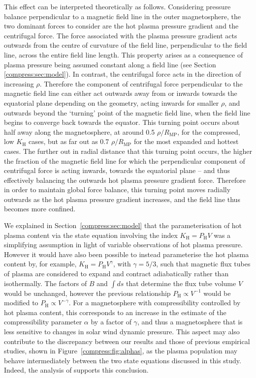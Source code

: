 This effect can be interpreted theoretically as follows. Considering pressure balance perpendicular to a magnetic field line in the outer magnetosphere, the two dominant forces to consider are the hot plasma pressure gradient and the centrifugal force. The force associated with the plasma pressure gradient acts outwards from the centre of curvature of the field line, perpendicular to the field line, across the entire field line length. This property arises as a consequence of plasma pressure being assumed constant along a field line (see Section \ref{compress:sec:model}). In contrast, the centrifugal force acts in the direction of increasing $\rho$. Therefore the component of centrifugal force perpendicular to the magnetic field line can either act outwards away from or inwards towards the equatorial plane depending on the geometry, acting inwards for smaller $\rho$, and outwards beyond the `turning' point of the magnetic field line, when the field line begins to converge back towards the equator. This turning point occurs about half away along the magnetosphere, at around 0.5 $\rho/R_\mathrm{MP}$, for the compressed, low $K_\mathrm{H}$ cases, but as far out as 0.7 $\rho/R_\mathrm{MP}$ for the most expanded and hottest cases. The further out in radial distance that this turning point occurs, the higher the fraction of the magnetic field line for which the perpendicular component of centrifugal force is acting inwards, towards the equatorial plane – and thus effectively balancing the outwards hot plasma pressure gradient force. Therefore in order to maintain global force balance, this turning point moves radially outwards as the hot plasma pressure gradient increases, and the field line thus becomes more confined.

We explained in Section~\ref{compress:sec:model} that the parameterisation of hot plasma content via the state equation involving the index $K_\mathrm{H}=P_\mathrm{H}V$ was a simplifying assumption in light of variable observations of hot plasma pressure. However it would have also been possible to instead parameterise the hot plasma content by, for example, $K_\mathrm{H}=P_\mathrm{H}V^\gamma$, with $\gamma=5/3$, such that magnetic flux tubes of plasma are considered to expand and contract adiabatically rather than isothermally. The factors of $B$ and $\int ds$ that determine the flux tube volume $V$ would be unchanged, however the previous relationship $P_\mathrm{H}\propto V^{-1}$ would be modified to $P_\mathrm{H} \propto V^{-\gamma}$. For a magnetosphere with compressibility controlled by hot plasma content, this corresponds to an increase in the estimate of the compressibility parameter $\alpha$ by a factor of $\gamma$, and thus a magnetosphere that is less sensitive to changes in solar wind dynamic pressure. This aspect may also contribute to the discrepancy between our results and those of previous empirical studies, shown in Figure~\ref{compress:fig:alphas}, as the plasma population may behave intermediately between the two state equations discussed in this study. Indeed, the analysis of \citet{achilleos2010a} supports this conclusion.


